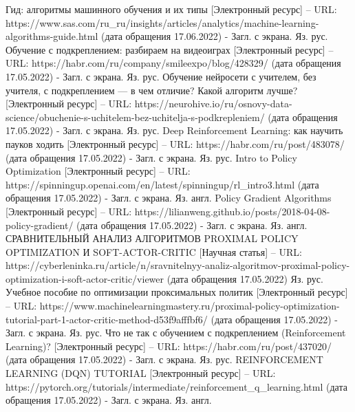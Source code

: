 \documentclass[bachelor, och, coursework]{shiza}
\begin{document}
\begin{thebibliography}{3}
    Гид: алгоритмы машинного обучения и их типы [Электронный ресурс] – URL: https://www.sas.com/ru_ru/insights/articles/analytics/machine-learning-algorithms-guide.html (дата обращения 17.06.2022) - Загл. с экрана. Яз. рус.
    Обучение с подкреплением: разбираем на видеоиграх [Электронный ресурс] – URL: https://habr.com/ru/company/smileexpo/blog/428329/ (дата обращения 17.05.2022) - Загл. с экрана. Яз. рус.
    Обучение нейросети с учителем, без учителя, с подкреплением — в чем отличие? Какой алгоритм лучше? [Электронный ресурс] – URL: https://neurohive.io/ru/osnovy-data-science/obuchenie-s-uchitelem-bez-uchitelja-s-podkrepleniem/ (дата обращения 17.05.2022) - Загл. с экрана. Яз. рус.
    Deep Reinforcement Learning: как научить пауков ходить [Электронный ресурс] – URL: https://habr.com/ru/post/483078/ (дата обращения 17.05.2022) - Загл. с экрана. Яз. рус.
    Intro to Policy Optimization [Электронный ресурс] – URL: https://spinningup.openai.com/en/latest/spinningup/rl_intro3.html (дата обращения 17.05.2022) - Загл. с экрана. Яз. англ.
    Policy Gradient Algorithms [Электронный ресурс] – URL: https://lilianweng.github.io/posts/2018-04-08-policy-gradient/ (дата обращения 17.05.2022) - Загл. с экрана. Яз. англ.
    СРАВНИТЕЛЬНЫЙ АНАЛИЗ АЛГОРИТМОВ PROXIMAL POLICY OPTIMIZATION И SOFT-ACTOR-CRITIC [Научная статья] – URL: https://cyberleninka.ru/article/n/sravnitelnyy-analiz-algoritmov-proximal-policy-optimization-i-soft-actor-critic/viewer (дата обращения 17.05.2022) Яз. рус.
    Учебное пособие по оптимизации проксимальных политик [Электронный ресурс] – URL: https://www.machinelearningmastery.ru/proximal-policy-optimization-tutorial-part-1-actor-critic-method-d53f9afffbf6/ (дата обращения 17.05.2022) - Загл. с экрана. Яз. рус.
    Что не так с обучением с подкреплением (Reinforcement Learning)? [Электронный ресурс] – URL: https://habr.com/ru/post/437020/ (дата обращения 17.05.2022) - Загл. с экрана. Яз. рус.
    REINFORCEMENT LEARNING (DQN) TUTORIAL [Электронный ресурс] – URL: https://pytorch.org/tutorials/intermediate/reinforcement_q_learning.html (дата обращения 17.05.2022) - Загл. с экрана. Яз. англ.
\end{thebibliography}
\end{document}
